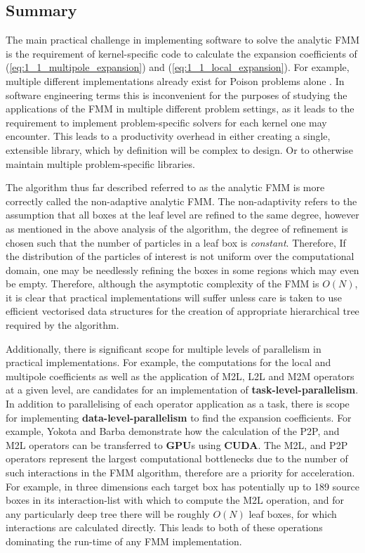 \subsection{Summary}

The main practical challenge in implementing software to solve the analytic FMM
is the requirement of kernel-specific code to calculate the expansion coefficients of
(\ref{eq:1_1_multipole_expansion}) and (\ref{eq:1_1_local_expansion}). For example,
multiple different implementations already exist for Poison problems alone \cite{Greengard:1996:JCP, Etheridge:2001:SIAM}.
In software engineering terms this is inconvenient for the purposes of studying
the applications of the FMM in multiple different problem settings, as it leads to the requirement
to implement problem-specific solvers for each kernel one may encounter. This
leads to a productivity overhead in either creating a single, extensible
library, which by definition will be complex to design. Or to otherwise
maintain multiple problem-specific libraries.

The algorithm thus far described referred to as the analytic FMM is more correctly
called the non-adaptive analytic FMM. The non-adaptivity refers to the assumption that
all boxes at the leaf level are refined to the same degree, however as mentioned
in the above analysis of the algorithm, the degree of refinement is chosen such
that the number of particles in a leaf box is \textit{constant}. Therefore, If
the distribution of the particles of interest is not uniform over the computational
domain, one may be needlessly refining the boxes in some regions which may even be
empty. Therefore, although the asymptotic complexity of
the FMM is $O(N)$, it is clear that practical implementations will suffer unless
care is taken to use efficient vectorised data structures for the creation of
appropriate hierarchical tree required by the algorithm.

Additionally, there is significant scope for multiple levels of
parallelism in practical implementations. For example, the computations
for the local and multipole coefficients as well as the application of M2L, L2L
and M2M operators at a given level, are candidates for an implementation of
\textbf{\gls{task-level-parallelism}}. In addition to parallelising of each operator
application as a task, there is scope for implementing
\textbf{\gls{data-level-parallelism}} to find the expansion coefficients. For example,
Yokota and Barba \cite{Hwu:2011:MKP} demonstrate how the calculation of the P2P,
and M2L operators can be transferred to \textbf{\gls{GPU}}s using \textbf{\gls{CUDA}}.
The M2L, and P2P operators represent the largest computational bottlenecks due to
the number of such interactions in the FMM algorithm, therefore are a priority for
acceleration. For example, in three dimensions each target box has potentially
up to 189 source boxes in its \gls{interaction-list} with which to compute the
M2L operation, and for any particularly deep tree there will be roughly $O(N)$
leaf boxes, for which interactions are calculated directly. This leads to both of
these operations dominating the run-time of any \gls{FMM} implementation.

